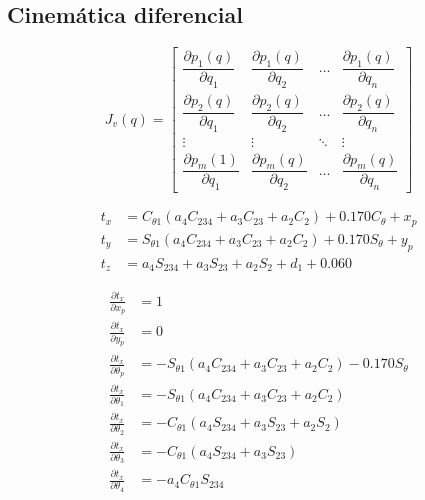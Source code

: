 \subsection{Cinemática diferencial}

\begin{equation*}
    J_v(q) =
    \begin{bmatrix}
        \dfrac{\partial p_1(q)}{\partial q_1} & \dfrac{\partial p_1(q)}{\partial q_2} & \dotsc & \dfrac{\partial p_1(q)}{\partial q_n} \\
        \dfrac{\partial p_2(q)}{\partial q_1} & \dfrac{\partial p_2(q)}{\partial q_2} & \dotsc & \dfrac{\partial p_2(q)}{\partial q_n} \\
        \vdots & \vdots & \ddots & \vdots \\
        \dfrac{\partial p_m(1)}{\partial q_1} & \dfrac{\partial p_m(q)}{\partial q_2} & \dotsc & \dfrac{\partial p_m(q)}{\partial q_n}
    \end{bmatrix}
\end{equation*}

\begin{equation*}
    \begin{split}
        t_x & = C_{\theta 1} ( a_4C_{234} + a_3C_{23} + a_2C_2 ) + 0.170C_\theta + x_p \\
        t_y & = S_{\theta 1} ( a_4C_{234} + a_3C_{23} + a_2C_2 ) + 0.170S_\theta + y_p \\
        t_z & = a_4S_{234} + a_3S_{23} + a_2S_2 + d_1 + 0.060
    \end{split}
\end{equation*}

\newpage
\begin{equation*}
    \begin{split}
        \frac{\partial t_x}{\partial x_p} & = 1 \\
        \frac{\partial t_x}{\partial y_p} & = 0 \\
        \frac{\partial t_x}{\partial \theta_p} & = -S_{\theta 1} ( a_4C_{234}+a_3C_{23}+a_2C_2 ) - 0.170S_\theta \\
        \frac{\partial t_x}{\partial \theta_1} & = -S_{\theta 1} ( a_4C_{234}+a_3C_{23}+a_2C_2 ) \\
        \frac{\partial t_x}{\partial \theta_2} & = -C_{\theta 1} ( a_4S_{234}+a_3S_{23}+a_2S_2 ) \\
        \frac{\partial t_x}{\partial \theta_3} & = -C_{\theta 1} ( a_4S_{234}+a_3S_{23} ) \\
        \frac{\partial t_x}{\partial \theta_4} & = -a_4C_{\theta 1}S_{234}
    \end{split}
\end{equation*}

